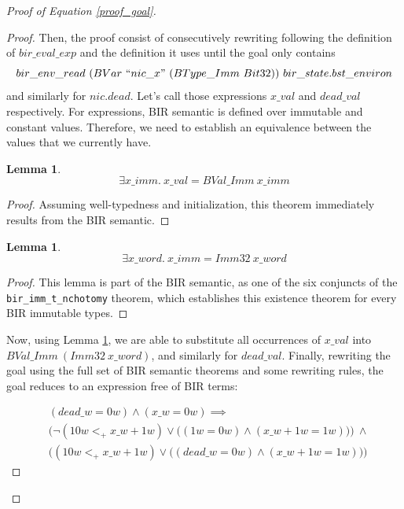 \documentclass{kththesis}
\newtheorem{lemma}[theorem]{Lemma}
\begin{document}
{\begin{proof}[Proof of Equation \ref{proof_goal}]
\begin{proof}
Then, the proof consist of consecutively rewriting following the definition of $bir\_eval\_exp$ and the definition it uses until the goal only contains $$bir\_env\_read~(BVar~``nic\_x"~(BType\_Imm~Bit32))~bir\_state.bst\_environ$$ and similarly for $nic.dead$. Let's call those expressions $x\_val$ and $dead\_val$ respectively. For expressions, BIR semantic is defined over immutable and constant values. Therefore, we need to establish an equivalence between the values that we currently have.

\begin{lemma}
	\begin{equation*}
		\exists x\_imm.~x\_val = BVal\_Imm~x\_imm
	\end{equation*}
	\label{proof_exists_x_imm}
\end{lemma}
\begin{proof}
Assuming well-typedness and initialization, this theorem immediately results from the BIR semantic.
\end{proof}

\begin{lemma}
	\begin{equation*}
		\exists x\_word.~x\_imm = Imm32~x\_word
	\end{equation*}
	\label{proof_exists_x_word}
\end{lemma}
\begin{proof}
This lemma is part of the BIR semantic, as one of the six conjuncts of the \texttt{bir\_imm\_t\_nchotomy} theorem, which establishes this existence theorem for every BIR immutable types.
\end{proof}

Now, using Lemma \ref{proof_exists_x_imm}, we are able to substitute all occurrences of $x\_val$ into $BVal\_Imm~(Imm32~x\_word)$, and similarly for $dead\_val$. Finally, rewriting the goal using the full set of BIR semantic theorems and some rewriting rules, the goal reduces to an expression free of BIR terms:

\begin{equation} \label{proof_wp_word_goal}
\begin{split}
&(dead\_w = 0w) \land (x\_w = 0w) \implies\\
&\Big(\neg(10w <_{+} x\_w + 1w) \lor \big((1w = 0w) \land (x\_w + 1w = 1w)\big)\Big)~\land\\
&\Big((10w <_{+} x\_w + 1w) \lor \big((dead\_w = 0w) \land (x\_w + 1w = 1w)\big)\Big)
\end{split}
\end{equation}


\end{proof}
\end{proof}}
\end{document}
